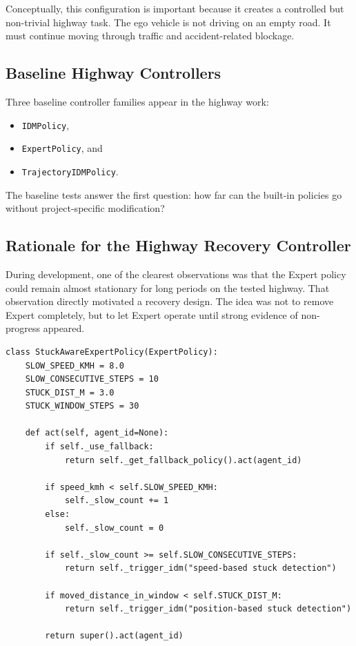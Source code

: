 \documentclass[12pt,a4paper]{report}
\begin{document}
Conceptually, this configuration is important because it creates a controlled but non-trivial highway task. The ego vehicle is not driving on an empty road. It must continue moving through traffic and accident-related blockage.

\subsection{Baseline Highway Controllers}
Three baseline controller families appear in the highway work:

\begin{itemize}
    \item \texttt{IDMPolicy},
    \item \texttt{ExpertPolicy}, and
    \item \texttt{TrajectoryIDMPolicy}.
\end{itemize}

The baseline tests answer the first question: how far can the built-in policies go without project-specific modification?

\subsection{Rationale for the Highway Recovery Controller}
During development, one of the clearest observations was that the Expert policy could remain almost stationary for long periods on the tested highway. That observation directly motivated a recovery design. The idea was not to remove Expert completely, but to let Expert operate until strong evidence of non-progress appeared.

\begin{lstlisting}[caption={Core recovery logic of the highway Expert+IDM policy.},label={lst:expert_idm_logic},float=H]
class StuckAwareExpertPolicy(ExpertPolicy):
    SLOW_SPEED_KMH = 8.0
    SLOW_CONSECUTIVE_STEPS = 10
    STUCK_DIST_M = 3.0
    STUCK_WINDOW_STEPS = 30

    def act(self, agent_id=None):
        if self._use_fallback:
            return self._get_fallback_policy().act(agent_id)

        if speed_kmh < self.SLOW_SPEED_KMH:
            self._slow_count += 1
        else:
            self._slow_count = 0

        if self._slow_count >= self.SLOW_CONSECUTIVE_STEPS:
            return self._trigger_idm("speed-based stuck detection")

        if moved_distance_in_window < self.STUCK_DIST_M:
            return self._trigger_idm("position-based stuck detection")

        return super().act(agent_id)
\end{lstlisting}
\end{document}
